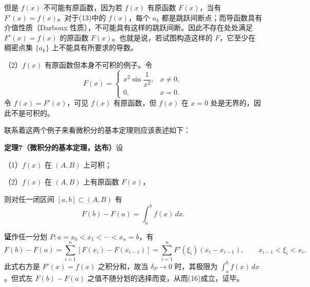 但是 $f(x)$ 不可能有原函数，因为若 $f(x)$ 有原函数 $F(x)$，当有 $F'(x)=f(x)$。对于(13)中的 $f(x)$，每个 $a_k$ 都是跳跃间断点；而导函数具有介值性质（Darboux 性质），不可能具有这样的跳跃间断。因此不存在处处满足 $F'(x)=f(x)$ 的原函数 $F(x)$。也就是说，若试图构造这样的 $F$，它至少在稠密点集 $\{a_k\}$ 上不能具有所要求的导数。

（2）$f(x)$ 有原函数但本身不可积的例子。令
\begin{equation}
 F(x)=
 \begin{cases}
 x^2\sin\dfrac1{x^2},&x\ne0,\\[4pt]
 0,&x=0.
 \end{cases}
 \tag{15}
\end{equation}
令 $f(x)=F'(x)$，可见 $f(x)$ 有原函数，但 $f(x)$ 在 $x=0$ 处是无界的，因此不是可积的。

联系着这两个例子来看微积分的基本定理则应该表述如下：

\noindent\textbf{定理7（微积分的基本定理，达布）}\quad 设

（1）$f(x)$ 在 $(A,B)$ 上可积；

（2）$f(x)$ 在 $(A,B)$ 上有原函数 $F(x)$，

则对任一闭区间 $[a,b]\subset(A,B)$ 有
\begin{equation}
 F(b)-F(a)=\int_a^b f(x)\,dx.
 \tag{16}
\end{equation}

\noindent\textbf{证}\quad 作任一分划 $P:a=x_0<x_1<\cdots<x_n=b$，有
\[
 F(b)-F(a)=\sum_{i=1}^{n}[F(x_i)-F(x_{i-1})]
 =\sum_{i=1}^{n}F'(\xi_i)(x_i-x_{i-1}),
 \qquad x_{i-1}<\xi_i<x_i.
\]
此式右方是 $F'(x)=f(x)$ 之积分和，故当 $\delta_P\to0$ 时，其极限为 $\int_a^b f(x)\,dx$。但式左 $F(b)-F(a)$ 之值不随分划的选择而变，从而(16)成立，证毕。
